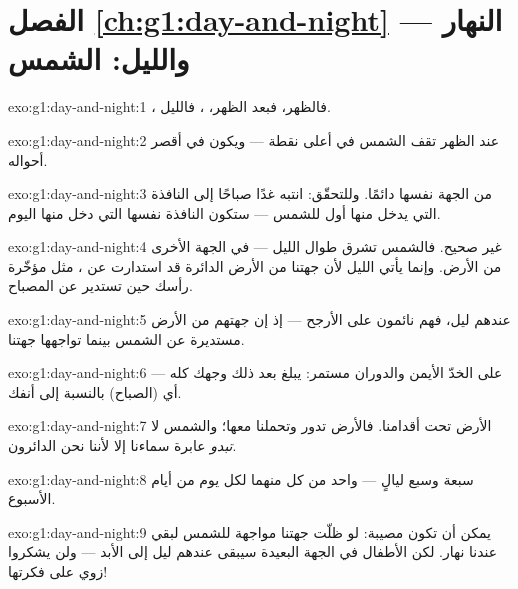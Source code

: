 \section*{الفصل \ref{ch:g1:day-and-night} --- النهار والليل: الشمس}

\begin{solution}{exo:g1:day-and-night:1}
، فالظهر، فبعد الظهر، ، فالليل.
\end{solution}

\begin{solution}{exo:g1:day-and-night:2}
عند الظهر تقف الشمس في أعلى نقطة --- ويكون  في أقصر أحواله.
\end{solution}

\begin{solution}{exo:g1:day-and-night:3}
من الجهة نفسها دائمًا. وللتحقّق: انتبه غدًا صباحًا إلى النافذة
التي يدخل منها أول  للشمس --- ستكون النافذة نفسها التي دخل
منها اليوم.
\end{solution}

\begin{solution}{exo:g1:day-and-night:4}
غير صحيح. فالشمس تشرق طوال الليل --- في الجهة الأخرى من الأرض.
وإنما يأتي الليل لأن جهتنا من الأرض الدائرة قد استدارت عن ،
مثل مؤخّرة رأسك حين تستدير عن المصباح.
\end{solution}

\begin{solution}{exo:g1:day-and-night:5}
عندهم ليل، فهم نائمون على الأرجح --- إذ إن جهتهم من الأرض
مستديرة عن الشمس بينما تواجهها جهتنا.
\end{solution}

\begin{solution}{exo:g1:day-and-night:6}
 على الخدّ الأيمن والدوران مستمر: يبلغ  بعد ذلك وجهك
كله --- أي  (الصباح) بالنسبة إلى أنفك.
\end{solution}

\begin{solution}{exo:g1:day-and-night:7}
الأرض تحت أقدامنا. فالأرض تدور وتحملنا معها؛ والشمس لا
\emph{تبدو} عابرة سماءنا إلا لأننا نحن الدائرون.
\end{solution}

\begin{solution}{exo:g1:day-and-night:8}
سبعة  وسبع ليالٍ --- واحد من كل منهما لكل يوم من أيام
الأسبوع.
\end{solution}

\begin{solution}{exo:g1:day-and-night:9}
يمكن أن تكون مصيبة: لو ظلّت جهتنا مواجهة للشمس لبقي عندنا نهار.
لكن الأطفال في الجهة البعيدة سيبقى عندهم ليل إلى الأبد ---
ولن يشكروا زوي على فكرتها!
\end{solution}
